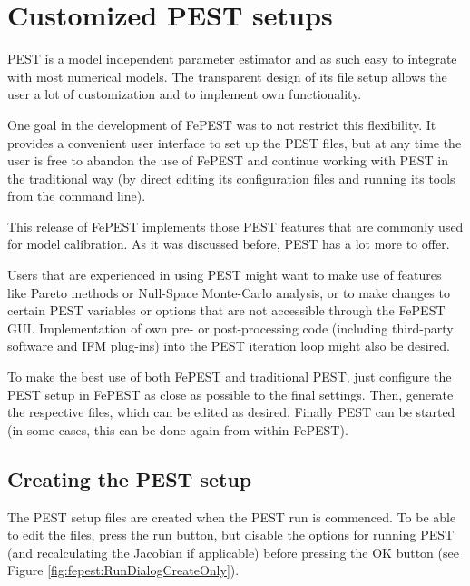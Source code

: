 \chapter{Customized PEST setups}
\label{sec:fepest:AdvancedMethods}

PEST is a model independent parameter estimator and as such easy to integrate with most numerical models. The transparent design of its file setup allows the user a lot of customization and to implement own functionality.

One goal in the development of FePEST was to not restrict this flexibility.  It provides a convenient user interface to set up the PEST files, but at any time the user is free to abandon the use of FePEST and continue working with PEST in the traditional way (by direct editing its configuration files and running its tools from the command line).

This release of FePEST implements those PEST features that are commonly used for model calibration. As it was discussed before, PEST has a lot more to offer.

Users that are experienced in using PEST might want to make use of features like Pareto methods or Null-Space Monte-Carlo analysis, or to make changes to certain PEST variables or options that are not accessible through the FePEST GUI. Implementation of own pre- or post-processing code (including third-party software and IFM plug-ins) into the PEST iteration loop might also be desired.

To make the best use of both FePEST and traditional PEST, just configure the PEST setup in FePEST as close as possible to the final settings. Then, generate the respective files, which can be edited as desired. Finally PEST can be started (in some cases, this can be done again from within FePEST).

\section{Creating the PEST setup}

The PEST setup files are created when the PEST run is commenced. To be able to edit the files, press the run button, but disable the options for running PEST (and recalculating the Jacobian if applicable) before pressing the OK button (see Figure \ref{fig:fepest:RunDialogCreateOnly}).


